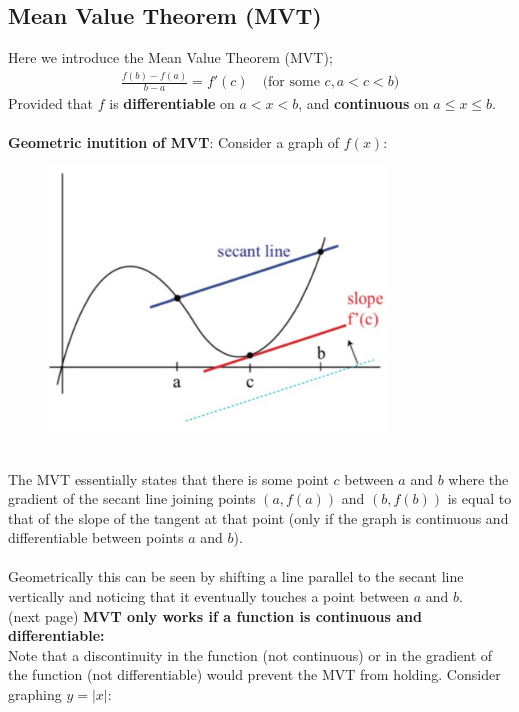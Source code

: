 \documentclass{report}
\begin{document}
\subsection{Mean Value Theorem (MVT)} %
Here we introduce the Mean Value Theorem (MVT);
\begin{align*}
\frac{f(b)-f(a)}{b-a}=f'(c)\quad\text{(for some $c,a<c<b$)}
\end{align*}
Provided that $f$ is \textbf{differentiable} on $a<x<b$,
and \textbf{continuous} on $a\leq x\leq b$.\\
\vspace{1mm}\\
\textbf{Geometric inutition of MVT}: Consider
a graph of $f(x)$:
\begin{figure}[h]
\includegraphics[width=9cm]{Capture22}\\
\centering
{}
\end{figure}\\
The MVT essentially states that there is some point $c$ between $a$ and $b$ 
where the gradient of the secant line joining points $(a,f(a))$ and $(b,f(b))$ 
is equal to that of the slope of the tangent at that point 
(only if the graph is continuous and differentiable between points $a$ and $b$).\\
\vspace{1mm}\\
Geometrically this can be seen by shifting a line parallel to the secant line
vertically and noticing that it eventually touches a point between $a$ and $b$.\\
(next page)
\newpage
\noindent\textbf{MVT only works if a function is continuous and differentiable:}\\
Note that a discontinuity in the function (not continuous) or in the gradient 
of the function (not differentiable) would prevent the MVT from holding. Consider graphing $y=|x|$:\\
\end{document}

